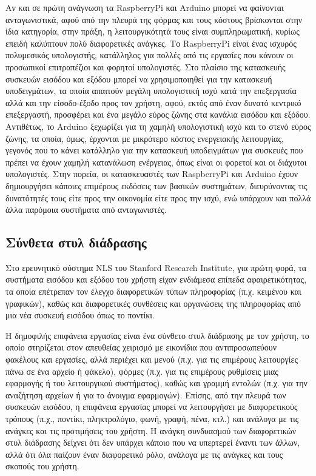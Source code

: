 \documentclass[
]{article}
\begin{document}
Αν και σε πρώτη ανάγνωση τα RaspberryPi και Arduino μπορεί να φαίνονται
ανταγωνιστικά, αφού από την πλευρά της φόρμας και τους κόστους
βρίσκονται στην ίδια κατηγορία, στην πράξη, η λειτουργικότητά τους είναι
συμπληρωματική, κυρίως επειδή καλύπτουν πολύ διαφορετικές ανάγκες. Το
RaspberryPi είναι ένας ισχυρός πολυμεσικός υπολογιστής, κατάλληλος για
πολλές από τις εργασίες που κάνουν οι προσωπικοί επιτραπέζιοι και
φορητοί υπολογιστές. Στο πλαίσιο της κατασκευής συσκευών εισόδου και
εξόδου μπορεί να χρησιμοποιηθεί για την κατασκευή υποδειγμάτων, τα οποία
απαιτούν μεγάλη υπολογιστική ισχύ κατά την επεξεργασία αλλά και την
είσοδο-έξοδο προς τον χρήστη, αφού, εκτός από έναν δυνατό κεντρικό
επεξεργαστή, προσφέρει και ένα μεγάλο εύρος ζώνης στα κανάλια εισόδου
και εξόδου. Αντιθέτως, το Arduino ξεχωρίζει για τη χαμηλή υπολογιστική
ισχύ και το στενό εύρος ζώνης, τα οποία, όμως, έρχονται με μικρότερο
κόστος ενεργειακής λειτουργίας, γεγονός που το κάνει κατάλληλο για την
κατασκευή υποδειγμάτων για συσκευές που πρέπει να έχουν χαμηλή
κατανάλωση ενέργειας, όπως είναι οι φορετοί και οι διάχυτοι υπολογιστές.
Στην πορεία, οι κατασκευαστές των RaspberryPi και Arduino έχουν
δημιουργήσει κάποιες επιμέρους εκδόσεις των βασικών συστημάτων,
διευρύνοντας τις δυνατότητές τους είτε προς την οικονομία είτε προς την
ισχύ, ενώ υπάρχουν και πολλά άλλα παρόμοια συστήματα από ανταγωνιστές.

\hypertarget{ux3c3ux3cdux3bdux3b8ux3b5ux3c4ux3b1-ux3c3ux3c4ux3c5ux3bb-ux3b4ux3b9ux3acux3b4ux3c1ux3b1ux3c3ux3b7ux3c2}{%
\subsection{Σύνθετα στυλ
διάδρασης}\label{ux3c3ux3cdux3bdux3b8ux3b5ux3c4ux3b1-ux3c3ux3c4ux3c5ux3bb-ux3b4ux3b9ux3acux3b4ux3c1ux3b1ux3c3ux3b7ux3c2}}

Στο ερευνητικό σύστημα NLS του Stanford Research Institute, για πρώτη
φορά, τα συστήματα εισόδου και εξόδου του χρήστη είχαν ενδιάμεσα επίπεδα
αφαιρετικότητας, τα οποία επέτρεπαν τον έλεγχο διαφορετικών τύπων
πληροφορίας (π.χ. κειμένου και γραφικών), καθώς και διαφορετικές
συνθέσεις και οργανώσεις της πληροφορίας από μια νέα συσκευή εισόδου
όπως το ποντίκι.

Η δημοφιλής επιφάνεια εργασίας είναι ένα σύνθετο στυλ διάδρασης με τον
χρήστη, το οποίο στηρίζεται στον απευθείας χειρισμό με εικονίδια που
αντιπροσωπεύουν φακέλους και εργασίες, αλλά περιέχει και μενού (π.χ. για
τις επιμέρους λειτουργίες πάνω σε ένα αρχείο ή φάκελο), φόρμες (π.χ. για
τις επιμέρους ρυθμίσεις μιας εφαρμογής ή του λειτουργικού συστήματος),
καθώς και γραμμή εντολών (π.χ. για την αναζήτηση αρχείων ή για το
άνοιγμα εφαρμογών). Επίσης, από την πλευρά των συσκευών εισόδου, η
επιφάνεια εργασίας μπορεί να λειτουργήσει με διαφορετικούς τρόπους
(π.χ., ποντίκι, πληκτρολόγιο, φωνή, γραφή, πένα, κτλ.) και ανάλογα με
τις ανάγκες και τις προτιμήσεις του χρήστη. Η ανάγκη συνδυασμού των
διαφορετικών στυλ διάδρασης δείχνει ότι δεν υπάρχει κάποιο που να
υπερτερεί έναντι των άλλων, αλλά ότι όλα παίζουν έναν διαφορετικό ρόλο,
ανάλογα με τις ανάγκες και τους σκοπούς του χρήστη.
\end{document}
